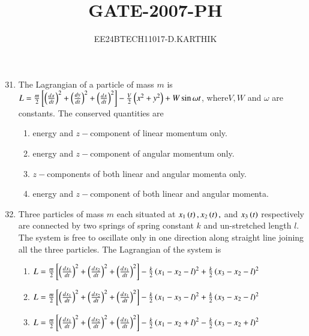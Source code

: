 \documentclass[journal]{IEEEtran}
\begin{document}

\vspace{3cm}

\title{GATE-2007-PH}
\author{EE24BTECH11017-D.KARTHIK}
\maketitle

\renewcommand{\thefigure}{\theenumi}
\renewcommand{\thetable}{\theenumi}
\setlength{\intextsep}{10pt}


\renewcommand{\thetable}{\theenumi}

\begin{enumerate}
\setcounter{enumi}{30}  
    \item The Lagrangian of a particle of mass $m$ is $L = \frac{m}{2}{}\left[\left(\frac{dx}{dt}\right)^2 +\left(\frac{dy}{dt}\right)^2 +\left(\frac{dx}{dt}\right)^2\right]-\frac{V}{2}\left(x^2+y^2\right)+W\sin{\omega t}$, where$V,W$ and $\omega$ are constants. The conserved quantities are 
\begin{enumerate}
    \item energy and $z-$component of linear momentum only.
    \item energy and $z-$component of angular momentum only. 
    \item $z-$components of both linear and angular momenta only.
    \item energy and $z-$component of both linear and angular momenta.
\end{enumerate}
\item Three particles of mass $m$ each situated at $x_1\left(t\right), x_2\left(t\right),$ and $x_3\left(t\right)$ respectively are connected by two springs of spring constant $k$ and un-stretched length $l$. The system is free to oscillate only in one direction along straight line joining all the three particles. The Lagrangian of the system is 
\begin{enumerate}
    \item $L = \frac{m}{2}{}\left[\left(\frac{dx_1}{dt}\right)^2 +\left(\frac{dx_2}{dt}\right)^2 +\left(\frac{dx_1}{dt}\right)^2\right]-\frac{k}{2}\left(x_1-x_2-l\right)^2 + \frac{k}{2}\left(x_3 - x_2 - l\right)^2$
     \item $L = \frac{m}{2}{}\left[\left(\frac{dx_1}{dt}\right)^2 +\left(\frac{dx_2}{dt}\right)^2 +\left(\frac{dx_1}{dt}\right)^2\right]-\frac{k}{2}\left(x_1-x_3-l\right)^2 + \frac{k}{2}\left(x_3 - x_2 - l\right)^2$
      \item $L = \frac{m}{2}{}\left[\left(\frac{dx_1}{dt}\right)^2 +\left(\frac{dx_2}{dt}\right)^2 +\left(\frac{dx_1}{dt}\right)^2\right]-\frac{k}{2}\left(x_1-x_2+l\right)^2 - \frac{k}{2}\left(x_3 - x_2 + l\right)^2$

\end{enumerate}
\end{enumerate}
\end{document}
